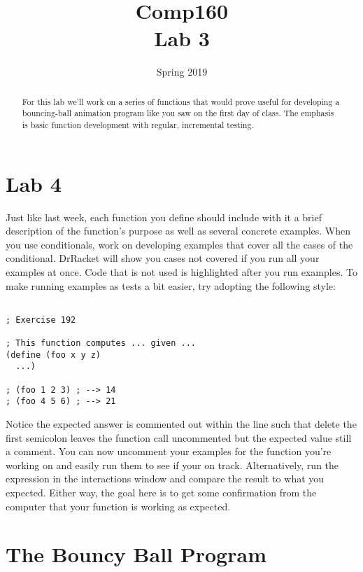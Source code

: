 \documentclass[nobib]{tufte-handout}
\title{Comp160 \\ Lab 3 }
\author{}
\date{ Spring 2019 }
\begin{document}
\maketitle

\begin{abstract}
For this lab we'll work on a series of functions that would prove useful for developing a bouncing-ball animation program like you saw on the first day of class.  The emphasis is basic function development with regular, incremental testing.
\end{abstract}

\section*{Lab 4}

Just like last week, each function you define should include with it a brief description of the function's purpose as well as several concrete examples. When you use conditionals, work on developing examples that cover all the cases of the conditional. DrRacket will show you cases not covered if you run all your examples at once. Code that is not used is highlighted after you run examples. To make running examples as tests a bit easier, try adopting the following style:

\begin{lstlisting}

; Exercise 192

; This function computes ... given ...
(define (foo x y z)
  ...)

; (foo 1 2 3) ; --> 14
; (foo 4 5 6) ; --> 21
\end{lstlisting}

Notice the expected answer is commented out within the line such that delete the first semicolon leaves the function call uncommented but the expected value still a comment. You can now uncomment your examples for the function you're working on and easily run them to see if your on track. Alternatively, run the expression in the interactions window and compare the result to what you expected. Either way, the goal here is to get some confirmation from the computer that your function is working as expected.

\section*{The Bouncy Ball Program}
\end{document}
